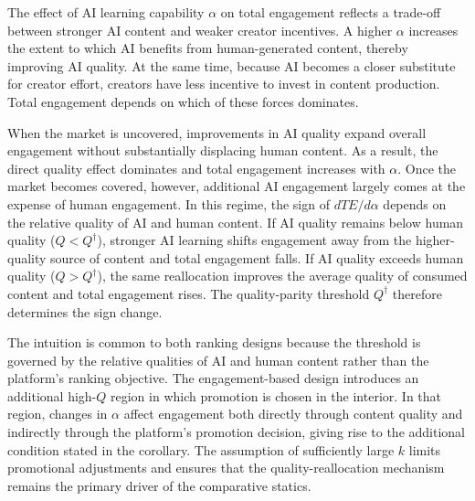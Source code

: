 The effect of AI learning capability $\alpha$ on total engagement reflects a trade-off between stronger AI content and weaker creator incentives. A higher $\alpha$ increases the extent to which AI benefits from human-generated content, thereby improving AI quality. At the same time, because AI becomes a closer substitute for creator effort, creators have less incentive to invest in content production. Total engagement depends on which of these forces dominates.

When the market is uncovered, improvements in AI quality expand overall engagement without substantially displacing human content. As a result, the direct quality effect dominates and total engagement increases with $\alpha$. Once the market becomes covered, however, additional AI engagement largely comes at the expense of human engagement. In this regime, the sign of $dTE/d\alpha$ depends on the relative quality of AI and human content. If AI quality remains below human quality ($Q<Q^{\dagger}$), stronger AI learning shifts engagement away from the higher-quality source of content and total engagement falls. If AI quality exceeds human quality ($Q>Q^{\dagger}$), the same reallocation improves the average quality of consumed content and total engagement rises. The quality-parity threshold $Q^{\dagger}$ therefore determines the sign change.

The intuition is common to both ranking designs because the threshold is governed by the relative qualities of AI and human content rather than the platform's ranking objective. The engagement-based design introduces an additional high-$Q$ region in which promotion is chosen in the interior. In that region, changes in $\alpha$ affect engagement both directly through content quality and indirectly through the platform's promotion decision, giving rise to the additional condition stated in the corollary. The assumption of sufficiently large $k$ limits promotional adjustments and ensures that the quality-reallocation mechanism remains the primary driver of the comparative statics.


